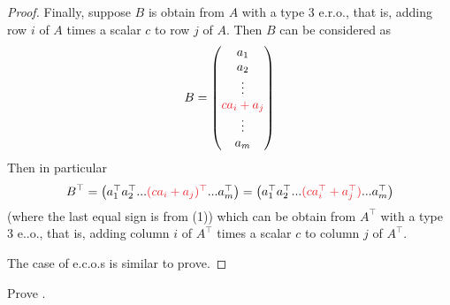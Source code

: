 \begin{proof}
Finally, suppose \(B\) is obtain from \(A\) with a type 3 e.r.o., that is, adding row \(i\) of \(A\) times a scalar \(c\) to row \(j\) of \(A\).
Then \(B\) can be considered as
\[
    B = \begin{pmatrix} a_1 \\ a_2 \\ \vdots \\ \RED{ca_i + a_j} \\ \vdots \\ a_m \end{pmatrix}
\]
Then in particular
\[
    B^\top = \begin{pmatrix} a_1^\top a_2^\top ... \RED{(ca_i + a_j)^\top} ... a_m^\top \end{pmatrix} = \begin{pmatrix} a_1^\top a_2^\top ... \RED{(ca_i^\top + a_j^\top)} ... a_m^\top \end{pmatrix}
\]
(where the last equal sign is from (1)) which can be obtain from \(A^\top\) with a type 3 e..o., that is, adding column \(i\) of \(A^\top\) times a scalar \(c\) to column \(j\) of \(A^\top\).

The case of e.c.o.s is similar to prove.
\end{proof}

\begin{exercise} \label{exercise 3.1.7}
Prove .
\end{exercise}

